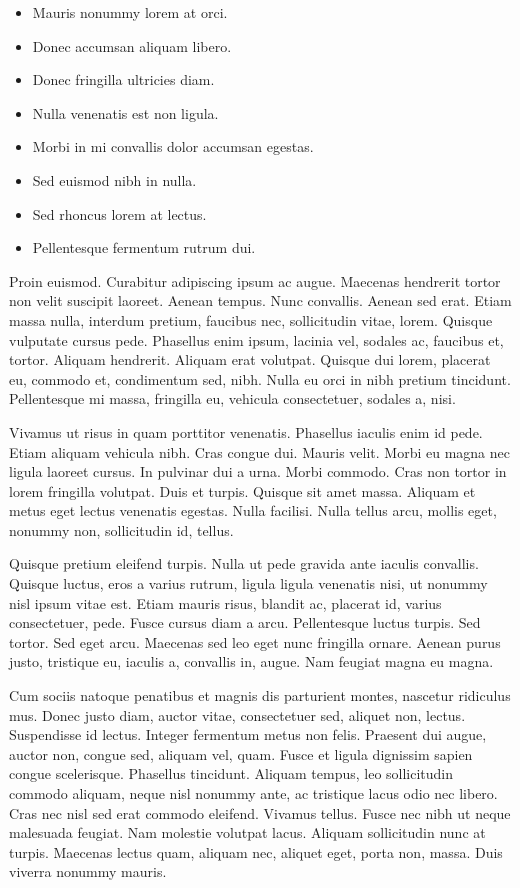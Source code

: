 \documentclass[eng,printmode]{mgr}
\begin{document}
\begin{itemize}
\item Mauris nonummy lorem at orci.
\item Donec accumsan aliquam libero.
\item Donec fringilla ultricies diam.
\item Nulla venenatis est non ligula.
\item Morbi in mi convallis dolor accumsan egestas.
\item Sed euismod nibh in nulla.
\item Sed rhoncus lorem at lectus.
\item Pellentesque fermentum rutrum dui.
\end{itemize}

Proin euismod. Curabitur adipiscing ipsum ac augue. Maecenas hendrerit tortor non velit suscipit laoreet. Aenean tempus. Nunc convallis. Aenean sed erat. Etiam massa nulla, interdum pretium, faucibus nec, sollicitudin vitae, lorem. Quisque vulputate cursus pede. Phasellus enim ipsum, lacinia vel, sodales ac, faucibus et, tortor. Aliquam hendrerit. Aliquam erat volutpat. Quisque dui lorem, placerat eu, commodo et, condimentum sed, nibh. Nulla eu orci in nibh pretium tincidunt. Pellentesque mi massa, fringilla eu, vehicula consectetuer, sodales a, nisi. 

Vivamus ut risus in quam porttitor venenatis. Phasellus iaculis enim id pede. Etiam aliquam vehicula nibh. Cras congue dui. Mauris velit. Morbi eu magna nec ligula laoreet cursus. In pulvinar dui a urna. Morbi commodo. Cras non tortor in lorem fringilla volutpat. Duis et turpis. Quisque sit amet massa. Aliquam et metus eget lectus venenatis egestas. Nulla facilisi. Nulla tellus arcu, mollis eget, nonummy non, sollicitudin id, tellus. 

Quisque pretium eleifend turpis. Nulla ut pede gravida ante iaculis convallis. Quisque luctus, eros a varius rutrum, ligula ligula venenatis nisi, ut nonummy nisl ipsum vitae est. Etiam mauris risus, blandit ac, placerat id, varius consectetuer, pede. Fusce cursus diam a arcu. Pellentesque luctus turpis. Sed tortor. Sed eget arcu. Maecenas sed leo eget nunc fringilla ornare. Aenean purus justo, tristique eu, iaculis a, convallis in, augue. Nam feugiat magna eu magna. 

Cum sociis natoque penatibus et magnis dis parturient montes, nascetur ridiculus mus. Donec justo diam, auctor vitae, consectetuer sed, aliquet non, lectus. Suspendisse id lectus. Integer fermentum metus non felis. Praesent dui augue, auctor non, congue sed, aliquam vel, quam. Fusce et ligula dignissim sapien congue scelerisque. Phasellus tincidunt. Aliquam tempus, leo sollicitudin commodo aliquam, neque nisl nonummy ante, ac tristique lacus odio nec libero. Cras nec nisl sed erat commodo eleifend. Vivamus tellus. Fusce nec nibh ut neque malesuada feugiat. Nam molestie volutpat lacus. Aliquam sollicitudin nunc at turpis. Maecenas lectus quam, aliquam nec, aliquet eget, porta non, massa. Duis viverra nonummy mauris.
\end{document}
